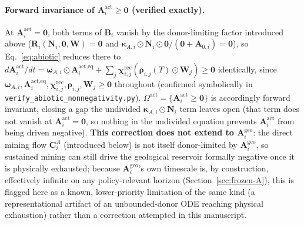 \documentclass[twocolumn,10pt]{article}
\begin{document}
\paragraph{Forward invariance of $\mathbf A^{\text{act}}_i\ge\mathbf 0$ (verified exactly).} At $\mathbf A^{\text{act}}_i=\mathbf 0$, both terms of $\mathbf B_i$ vanish by the donor-limiting factor introduced above ($\mathbf R_i(\mathbf N_i,\mathbf 0,\mathbf W)=\mathbf 0$ and $\boldsymbol\kappa_{A,i}\odot\mathbf N_i\odot\mathbf 0/(\mathbf 0+\mathbf A_{0,i})=\mathbf 0$), so Eq.~\eqref{eq:abiotic} reduces there to $d\mathbf A^{\text{act}}_i/dt=\boldsymbol\omega_{A,i}\odot\mathbf A^{\text{act},\text{eq}}_i+\sum_j\boldsymbol\chi^{\text{rec}}_{i,j}(\boldsymbol\rho_{i,j}(T)\odot\mathbf W_j)\ge\mathbf 0$ identically, since $\boldsymbol\omega_{A,i},\mathbf A^{\text{act},\text{eq}}_i,\boldsymbol\chi^{\text{rec}}_{i,j},\boldsymbol\rho_{i,j},\mathbf W_j\ge\mathbf 0$ throughout (confirmed symbolically in \texttt{verify\_abiotic\_nonnegativity.py}). $\Omega^{\text{act}}=\{\mathbf A^{\text{act}}_i\ge\mathbf 0\}$ is accordingly forward invariant, closing a gap the undivided $\boldsymbol\kappa_{A,i}\odot\mathbf N_i$ term leaves open (that term does not vanish at $\mathbf A^{\text{act}}_i=\mathbf 0$, so nothing in the undivided equation prevents $\mathbf A^{\text{act}}_i$ from being driven negative). \textbf{This correction does not extend to $\mathbf A^{\text{geo}}_i$}: the direct mining flow $\mathbf C^A_i$ (introduced below) is not itself donor-limited by $\mathbf A^{\text{geo}}_i$, so sustained mining can still drive the geological reservoir formally negative once it is physically exhausted; because $\mathbf A^{\text{geo}}_i$'s own timescale is, by construction, effectively infinite on any policy-relevant horizon (Section~\ref{sec:frozen-A}), this is flagged here as a known, lower-priority limitation of the same kind (a representational artifact of an unbounded-donor ODE reaching physical exhaustion) rather than a correction attempted in this manuscript.
\end{document}

